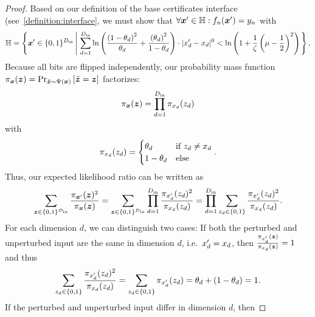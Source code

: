 \begin{proof}
Based on our definition of the base certificates interface (see~\cref{definition:interface}, we must show that
$\forall {\bm{x}}' \in {\mathbb{H}} : f_n({\bm{x}}') = y_n$ with
\begin{equation}
    \sH = \left\{ \vx' \in \{0,1\}^{D_\mathrm{in}} \left| \ 
        \sum_{d=1}^{D_\mathrm{in}}
            \ln\left( \frac{\left(1 - \evtheta_d\right)^2}{\evtheta_d}
            + \frac{\left(\evtheta_d\right)^2}{1 - \evtheta_d}
            \right)
             \cdot | \evx'_d - \evx_d |^0
            <
            \ln\left(1 + \frac{1}{\zeta}\left(\mu - \frac{1}{2}\right)^2\right)
            \right.
    \right\},
\end{equation}
Because all bits are flipped independently, our probability mass function
$\pi_{{\bm{x}}}({\bm{z}}) = \Pr_{\tilde{{\bm{z}}} \sim \Psi({\bm{x}})}\left[\tilde{{\bm{z}}} = {\bm{z}}\right]$
factorizes:
\begin{equation}
    \pi_{{\bm{x}}}({\bm{z}}) = \prod_{d=1}^{D_\mathrm{in}} \pi_{{x}_d}({z}_d)
\end{equation}
with
\begin{equation}
     \pi_{{x}_d}({z}_d) = 
    \begin{cases}
    {\theta}_d & \text{if } {z}_d \neq {x}_d\\
    1 - {\theta}_d & \text{else}\\
    \end{cases}.
\end{equation}
Thus, our expected likelihood ratio can be written as 
\begin{equation}
    \sum_{{\bm{z}} \in \{0,1\}^{D_\mathrm{in}}} \frac{\pi_{{\bm{x}}'}({\bm{z}})^2}{\pi_{{\bm{x}}}({\bm{z}})}
    =
    \sum_{{\bm{z}} \in \{0,1\}^{D_\mathrm{in}}}
    \prod_{d=1}^{D_\mathrm{in}} \frac{\pi_{{x}'_d}({z}_d)^2}{\pi_{{x}_d}({z}_d)}
    =
    \prod_{d=1}^{D_\mathrm{in}}
    \sum_{{z}_d \in \{0,1\}}
     \frac{\pi_{{x}'_d}({z}_d)^2}{\pi_{{x}_d}({z}_d)}.
\end{equation}
For each dimension $d$, we can distinguish two cases:
If both the perturbed and unperturbed input are the same in dimension $d$, i.e.~${x}'_d = {x}_d$, then $\frac{\pi_{{x}'_d}({\bm{z}})}{\pi_{{x}_d}({\bm{z}})} = 1$ and thus 
\begin{equation}
\sum_{{z}_d \in \{0,1\}}
     \frac{\pi_{{x}'_d}({z}_d)^2}{\pi_{{x}_d}({z}_d)} 
     =
    \sum_{{z}_d \in \{0,1\}}
     \pi_{{x}'_d}({z}_d)
     = {\theta}_d  + (1-{\theta}_d) = 1.
\end{equation}
If the perturbed and unperturbed input differ in dimension $d$, then

\end{proof}
